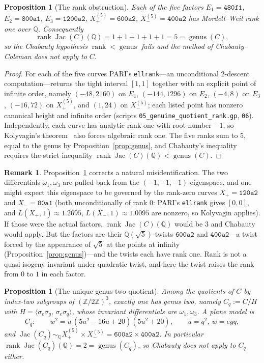 \documentclass[11pt,reqno]{amsart}
\theoremstyle{plain}
\newtheorem{proposition}[theorem]{Proposition}
\theoremstyle{definition}
\newtheorem{remark}[theorem]{Remark}
\newcommand{\Q}{\mathbb{Q}}
\newcommand{\Z}{\mathbb{Z}}
\DeclareMathOperator{\Jac}{Jac}
\DeclareMathOperator{\rank}{rank}
\begin{document}
\begin{proposition}[The rank obstruction]\label{prop:rank}
Each of the five factors $E_1=\texttt{480f1}$, $E_2=\texttt{800a1}$,
$E_3=\texttt{1200a2}$, $X_+^{(5)}=\texttt{600a2}$, $X_-^{(5)}=\texttt{400a2}$
has Mordell--Weil rank one over $\Q$. Consequently
\[
\rank\Jac(C)(\Q)=1+1+1+1+1=5=\operatorname{genus}(C),
\]
so the Chabauty hypothesis $\rank<\operatorname{genus}$ fails and the method of
Chabauty--Coleman does not apply to $C$.
\end{proposition}

\begin{proof}
For each of the five curves PARI's \texttt{ellrank}---an unconditional
$2$-descent computation---returns the tight interval $[1,1]$ together with an
explicit point of infinite order, namely $(-48,2160)$ on $E_1$, $(-144,1296)$
on $E_2$, $(-4,8)$ on $E_3$, $(-16,72)$ on $X_+^{(5)}$, and $(1,24)$ on
$X_-^{(5)}$; each listed point has nonzero canonical height and infinite order
(scripts \texttt{05\_genuine\_quotient\_rank.gp}, \texttt{06}). Independently,
each curve has analytic rank one with root number $-1$, so Kolyvagin's
theorem~\cite{kolyvagin} also forces algebraic rank one. The five ranks sum to
$5$, equal to the genus by Proposition~\ref{prop:genus}, and Chabauty's
inequality requires the strict inequality $\rank\Jac(C)(\Q)<\operatorname{genus}(C)$.
\end{proof}

\begin{remark}\label{rem:wrongfactors}
Proposition~\ref{prop:rank} corrects a natural misidentification. The two
differentials $\omega_1,\omega_3$ are pulled back from the
$(-1,-1,-1)$-eigenspace, and one might expect this eigenspace to be governed by
the rank-zero curves $X_+=\texttt{120a2}$ and $X_-=\texttt{80a1}$ (both
unconditionally of rank $0$: PARI's \texttt{ellrank} gives $[0,0]$, and
$L(X_+,1)\approx1.2695$, $L(X_-,1)\approx1.0095$ are nonzero, so Kolyvagin
applies). If those were the actual factors, $\rank\Jac(C)(\Q)$ would be $3$ and
Chabauty would apply. But the factors are their $\Q(\sqrt5)$-twists
$\texttt{600a2}$ and $\texttt{400a2}$---a twist forced by the appearance of
$\sqrt5$ at the points at infinity (Proposition~\ref{prop:genus})---and the
twists each have rank one. Rank is not a quasi-isogeny invariant under
quadratic twist, and here the twist raises the rank from $0$ to $1$ in each
factor.
\end{remark}

\begin{proposition}[The unique genus-two quotient]\label{prop:g2quot}
Among the quotients of $C$ by index-two subgroups of $(\Z/2\Z)^3$, exactly one
has genus two, namely $C_q:=C/H$ with $H=\langle\sigma_e\sigma_g,\,
\sigma_e\sigma_q\rangle$, whose invariant differentials are $\omega_1,\omega_3$.
A plane model is
\[
C_q:\qquad w^2=u\,(5u^2-16u+20)(5u^2+20),\qquad u=q^2,\ w=egq,
\]
and $\Jac(C_q)\sim_{\Q}X_+^{(5)}\times X_-^{(5)}=\texttt{600a2}\times\texttt{400a2}$.
In particular $\rank\Jac(C_q)(\Q)=2=\operatorname{genus}(C_q)$, so Chabauty does
not apply to $C_q$ either.
\end{proposition}
\end{document}
